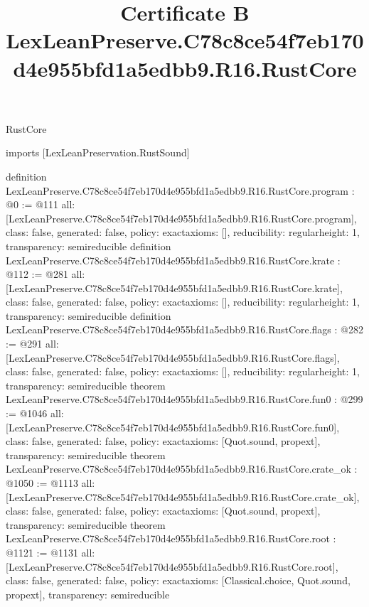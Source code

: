 \begin{lexlean}{RustCore}
\title{Certificate B LexLeanPreserve.C78c8ce54f7eb170d4e955bfd1a5edbb9.R16.RustCore}
\begin{coremodule}
imports [LexLeanPreservation.RustSound]

definition LexLeanPreserve.C78c8ce54f7eb170d4e955bfd1a5edbb9.R16.RustCore.program : @0 := @111 {
  all: [LexLeanPreserve.C78c8ce54f7eb170d4e955bfd1a5edbb9.R16.RustCore.program],
  class: false,
  generated: false,
  policy: exact{axioms: []},
  reducibility: regular{height: 1},
  transparency: semireducible
}
definition LexLeanPreserve.C78c8ce54f7eb170d4e955bfd1a5edbb9.R16.RustCore.krate : @112 := @281 {
  all: [LexLeanPreserve.C78c8ce54f7eb170d4e955bfd1a5edbb9.R16.RustCore.krate],
  class: false,
  generated: false,
  policy: exact{axioms: []},
  reducibility: regular{height: 1},
  transparency: semireducible
}
definition LexLeanPreserve.C78c8ce54f7eb170d4e955bfd1a5edbb9.R16.RustCore.flags : @282 := @291 {
  all: [LexLeanPreserve.C78c8ce54f7eb170d4e955bfd1a5edbb9.R16.RustCore.flags],
  class: false,
  generated: false,
  policy: exact{axioms: []},
  reducibility: regular{height: 1},
  transparency: semireducible
}
theorem LexLeanPreserve.C78c8ce54f7eb170d4e955bfd1a5edbb9.R16.RustCore.fun0 : @299 := @1046 {
  all: [LexLeanPreserve.C78c8ce54f7eb170d4e955bfd1a5edbb9.R16.RustCore.fun0],
  class: false,
  generated: false,
  policy: exact{axioms: [Quot.sound, propext]},
  transparency: semireducible
}
theorem LexLeanPreserve.C78c8ce54f7eb170d4e955bfd1a5edbb9.R16.RustCore.crate_ok : @1050 := @1113 {
  all: [LexLeanPreserve.C78c8ce54f7eb170d4e955bfd1a5edbb9.R16.RustCore.crate_ok],
  class: false,
  generated: false,
  policy: exact{axioms: [Quot.sound, propext]},
  transparency: semireducible
}
theorem LexLeanPreserve.C78c8ce54f7eb170d4e955bfd1a5edbb9.R16.RustCore.root : @1121 := @1131 {
  all: [LexLeanPreserve.C78c8ce54f7eb170d4e955bfd1a5edbb9.R16.RustCore.root],
  class: false,
  generated: false,
  policy: exact{axioms: [Classical.choice, Quot.sound, propext]},
  transparency: semireducible
}


\end{coremodule}
\end{lexlean}
